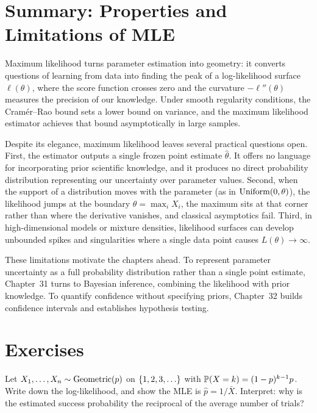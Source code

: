 \section{Summary: Properties and Limitations of MLE}
\label{ch30:summary}

\begin{focusbox}
Maximum likelihood turns parameter estimation into geometry: it converts questions of learning from data into finding the peak of a log-likelihood surface $\ell(\theta)$, where the score function crosses zero and the curvature $-\ell''(\theta)$ measures the precision of our knowledge. Under smooth regularity conditions, the Cram\'er--Rao bound sets a lower bound on variance, and the maximum likelihood estimator achieves that bound asymptotically in large samples.
\end{focusbox}

Despite its elegance, maximum likelihood leaves several practical questions open. First, the estimator outputs a single frozen point estimate $\hat\theta$. It offers no language for incorporating prior scientific knowledge, and it produces no direct probability distribution representing our uncertainty over parameter values. Second, when the support of a distribution moves with the parameter (as in $\Unif(0,\theta)$), the likelihood jumps at the boundary $\theta = \max_i X_i$, the maximum sits at that corner rather than where the derivative vanishes, and classical asymptotics fail. Third, in high-dimensional models or mixture densities, likelihood surfaces can develop unbounded spikes and singularities where a single data point causes $L(\theta) \to \infty$.

These limitations motivate the chapters ahead. To represent parameter
uncertainty as a full probability distribution rather than a single point
estimate, Chapter~31 turns to Bayesian inference, combining the likelihood with
prior knowledge. To quantify confidence without specifying priors, Chapter~32
builds confidence intervals and establishes hypothesis testing.

\section{Exercises}
\label{ch30:exercises}

\begin{exercise}
\label{ch30:exc-geom}
Let $X_1,\dots,X_n \sim \Geom(p)$ on $\set{1,2,3,\dots}$ with
$\P(X=k)=(1-p)^{k-1}p$. Write down the log-likelihood, and show the MLE is
$\hat p = 1/\bar X$. Interpret: why is the estimated success probability the
reciprocal of the average number of trials?
\end{exercise}

